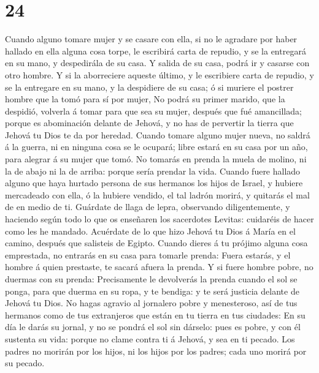 \hypertarget{section-23}{%
\section{24}\label{section-23}}

 Cuando alguno tomare mujer y se casare con ella, si no le
agradare por haber hallado en ella alguna cosa torpe, le escribirá carta
de repudio, y se la entregará en su mano, y despedirála de su casa.
 Y salida de su casa, podrá ir y casarse con otro hombre.
 Y si la aborreciere aqueste último, y le escribiere carta
de repudio, y se la entregare en su mano, y la despidiere de su casa; ó
si muriere el postrer hombre que la tomó para sí por mujer, 
No podrá su primer marido, que la despidió, volverla á tomar para que
sea su mujer, después que fué amancillada; porque es abominación delante
de Jehová, y no has de pervertir la tierra que Jehová tu Dios te da por
heredad.  Cuando tomare alguno mujer nueva, no saldrá á la
guerra, ni en ninguna cosa se le ocupará; libre estará en su casa por un
año, para alegrar á su mujer que tomó.  No tomarás en prenda
la muela de molino, ni la de abajo ni la de arriba: porque sería prendar
la vida.  Cuando fuere hallado alguno que haya hurtado
persona de sus hermanos los hijos de Israel, y hubiere mercadeado con
ella, ó la hubiere vendido, el tal ladrón morirá, y quitarás el mal de
en medio de ti.  Guárdate de llaga de lepra, observando
diligentemente, y haciendo según todo lo que os enseñaren los sacerdotes
Levitas: cuidaréis de hacer como les he mandado.  Acuérdate
de lo que hizo Jehová tu Dios á María en el camino, después que
salisteis de Egipto.  Cuando dieres á tu prójimo alguna
cosa emprestada, no entrarás en su casa para tomarle prenda:
 Fuera estarás, y el hombre á quien prestaste, te sacará
afuera la prenda.  Y si fuere hombre pobre, no duermas con
su prenda:  Precisamente le devolverás la prenda cuando el
sol se ponga, para que duerma en su ropa, y te bendiga: y te será
justicia delante de Jehová tu Dios.  No hagas agravio al
jornalero pobre y menesteroso, así de tus hermanos como de tus
extranjeros que están en tu tierra en tus ciudades:  En su
día le darás su jornal, y no se pondrá el sol sin dárselo: pues es
pobre, y con él sustenta su vida: porque no clame contra ti á Jehová, y
sea en ti pecado.  Los padres no morirán por los hijos, ni
los hijos por los padres; cada uno morirá por su pecado. 

